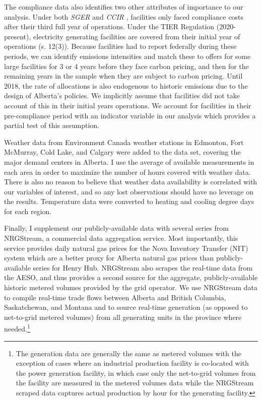 \documentclass[12pt]{article}
\newcommand{\SGER}{\textit{SGER} }
\newcommand{\CCIR}{\textit{CCIR} }
\begin{document}
The compliance data also identifies two other attributes of importance to our analysis. Under both \SGER and \CCIR, facilities only faced compliance costs after their third full year of operations. Under the TIER Regulation (2020-present), electricity generating facilities are covered from their initial year of operations (s. 12(3)). Because facilities had to report federally during these periods, we can identify emissions intensities and match these to offers for some large facilities for 3 or 4 years before they face carbon pricing, and then for the remaining years in the sample when they are subject to carbon pricing. Until 2018, the rate of allocations is also endogenous to historic emissions due to the design of Alberta's policies. We implicitly assume that facilities did not take account of this in their initial years operations. We account for facilities in their pre-compliance period with an indicator variable in our analysis which provides a partial test of this assumption. 

Weather data from Environment Canada weather stations in Edmonton, Fort McMurray, Cold Lake, and Calgary were added to the data set, covering the major demand centers in Alberta.  I use the average of available measurements in each area in order to maximize the number of hours covered with weather data. There is also no reason to believe that weather data availability is correlated with our variables of interest, and so any lost observations should have no leverage on the results. Temperature data were converted to heating and cooling degree days for each region.

Finally, I supplement our publicly-available data with several series from NRGStream, a commercial data aggregation service. Most importantly, this service provides daily natural gas prices for the Nova Inventory Transfer (NIT) system which are a better proxy for Alberta natural gas prices than publicly-available series for Henry Hub. NRGStream also scrapes the real-time data from the AESO, and thus provides a second source for the aggregate, publicly-available historic metered volumes provided by the grid operator. We use NRGStream data to compile real-time trade flows between Alberta and British Columbia, Saskatchewan, and Montana and to source real-time generation (as opposed to net-to-grid metered volumes) from all generating units in the province where needed.\footnote{The generation data are generally the same as metered volumes with the exception of cases where an industrial production facility is co-located with the power generation facility, in which case only the net-to-grid volumes from the facility are measured in the metered volumes data while the NRGStream scraped data captures actual production by hour for the generating facility.}
\end{document}
